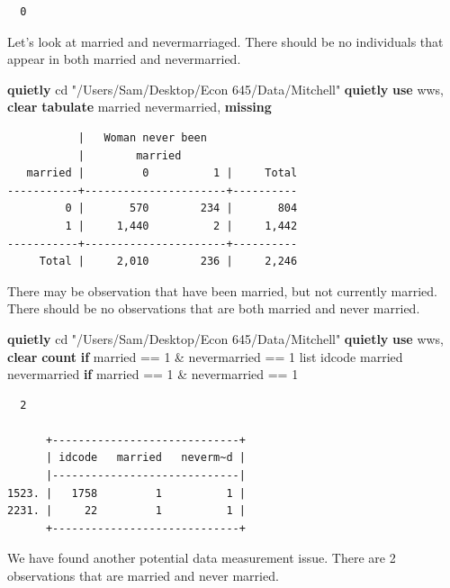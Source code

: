 \documentclass[
]{book}
\newenvironment{Shaded}{\begin{snugshade}}{\end{snugshade}}
\newcommand{\FunctionTok}[1]{\textcolor[rgb]{0.13,0.29,0.53}{\textbf{#1}}}
\newcommand{\KeywordTok}[1]{\textcolor[rgb]{0.13,0.29,0.53}{\textbf{#1}}}
\newcommand{\NormalTok}[1]{#1}
\newcommand{\OtherTok}[1]{\textcolor[rgb]{0.56,0.35,0.01}{#1}}
\newcommand{\StringTok}[1]{\textcolor[rgb]{0.31,0.60,0.02}{#1}}
\begin{document}
\begin{verbatim}
  0
\end{verbatim}

Let's look at married and nevermarriaged. There should be no individuals that appear in both married and nevermarried.

\begin{Shaded}
\begin{Highlighting}[]
\KeywordTok{quietly}\NormalTok{ cd }\StringTok{"/Users/Sam/Desktop/Econ 645/Data/Mitchell"}
\KeywordTok{quietly} \KeywordTok{use}\NormalTok{ wws, }\KeywordTok{clear}
\KeywordTok{tabulate}\NormalTok{ married nevermarried, }\FunctionTok{missing}
\end{Highlighting}
\end{Shaded}

\begin{verbatim}
           |   Woman never been
           |        married
   married |         0          1 |     Total
-----------+----------------------+----------
         0 |       570        234 |       804 
         1 |     1,440          2 |     1,442 
-----------+----------------------+----------
     Total |     2,010        236 |     2,246 
\end{verbatim}

There may be observation that have been married, but not currently married. There should be no observations that are both married and never married.

\begin{Shaded}
\begin{Highlighting}[]
\KeywordTok{quietly}\NormalTok{ cd }\StringTok{"/Users/Sam/Desktop/Econ 645/Data/Mitchell"}
\KeywordTok{quietly} \KeywordTok{use}\NormalTok{ wws, }\KeywordTok{clear}
\FunctionTok{count} \KeywordTok{if}\NormalTok{ married == 1 \& nevermarried == 1}
\OtherTok{list}\NormalTok{ idcode married nevermarried }\KeywordTok{if}\NormalTok{ married == 1 \& nevermarried == 1}
\end{Highlighting}
\end{Shaded}

\begin{verbatim}
  2

      +-----------------------------+
      | idcode   married   neverm~d |
      |-----------------------------|
1523. |   1758         1          1 |
2231. |     22         1          1 |
      +-----------------------------+
\end{verbatim}

We have found another potential data measurement issue. There are 2 observations that are married and never married.
\end{document}
